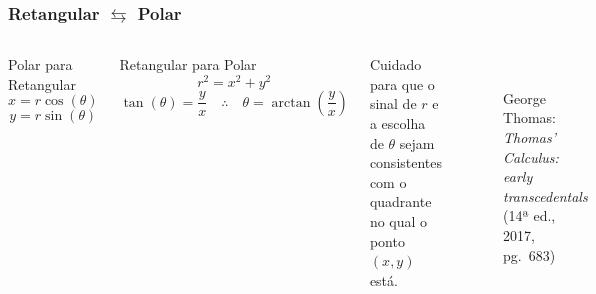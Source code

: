 \documentclass[pdftex, brazil, aspectratio=169]{beamer}
\begin{document}
\begin{frame}[t]
  \frametitle{Retangular $\leftrightarrows$ Polar}
  \begin{columns}
    \centering
  \begin{block}{Polar para Retangular}
    \begin{equation}
      x = r \cos(\theta)
    \end{equation}
    \begin{equation}
      y = r \sin(\theta)
    \end{equation}
  \end{block}
  \begin{block}{Retangular para Polar}
    \begin{equation}
      r^2 = x^2 + y^2
    \end{equation}
    \begin{equation}
      \tan(\theta) = \frac{y}{x} \quad \therefore \quad \theta = \arctan\left(\frac{y}{x}\right)
    \end{equation}
  \end{block}
  Cuidado para que o sinal de $r$ e a escolha de $\theta$ sejam
  consistentes com o quadrante no qual o ponto $(x,y)$ está.
  \centering
  \begin{figure}[H]
      \begin{center}
        \label{fig:int2-25}
        \\
        \footnotesize{George Thomas: \emph{Thomas' Calculus: early transcedentals}
          (14ª ed., 2017, pg.\ 683)}
      \end{center}
    \end{figure}
  \end{columns}
\end{frame}
\end{document}
